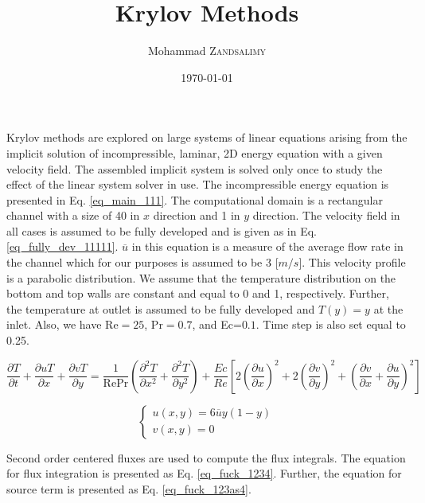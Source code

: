 \documentclass{article}
\title{Krylov Methods}
\author{Mohammad \textsc{Zandsalimy}}
\date{\today}
\begin{document}
\maketitle

Krylov methods are explored on large systems of linear equations arising from the implicit solution of incompressible, laminar, 2D energy equation with a given velocity field. The assembled implicit system is solved only once to study the effect of the linear system solver in use. The incompressible energy equation is presented in Eq. \ref{eq_main_111}. The computational domain is a rectangular channel  with a size of 40 in $x$ direction and 1 in $y$ direction. The velocity field in all cases is assumed to be fully developed and is given as in Eq. \ref{eq_fully_dev_11111}. $\overline{u}$ in this equation is a measure of the average flow rate in the channel which for our purposes is assumed to be 3 [$m/s$]. This velocity profile is a parabolic distribution. We assume that the temperature distribution on the bottom and top walls are constant and equal to 0 and 1, respectively. Further, the temperature at outlet is assumed to be fully developed and $T(y)=y$ at the inlet. Also, we have Re$=25$, Pr$=0.7$, and Ec=$0.1$. Time step is also set equal to 0.25.

\begin{equation}
\label{eq_main_111}
\dfrac{\partial T}{\partial t}+\dfrac{\partial uT}{\partial x}+\dfrac{\partial vT}{\partial y}=\dfrac{1}{\text{Re} \text{Pr}} \left( \dfrac{\partial^2 T}{\partial x^2}+\dfrac{\partial^2 T}{\partial y^2}\right) +\dfrac{Ec}{Re} \left[ 2\left(\dfrac{\partial  u}{\partial x}\right)^2+2\left(\dfrac{\partial  v}{\partial y}\right)^2 +\left(\dfrac{\partial  v}{\partial x}+\dfrac{\partial  u}{\partial y}\right)^2\right]
\end{equation}

\begin{equation}
\label{eq_fully_dev_11111}
\begin{cases}
u(x,y)=6 \overline{u} y(1-y) \\
v(x,y) = 0
\end{cases}
\end{equation}

Second order centered fluxes are used to compute the flux integrals. The equation for flux integration is presented as Eq. \ref{eq_fuck_1234}. Further, the equation for source term is presented as Eq. \ref{eq_fuck_123as4}.
\end{document}

